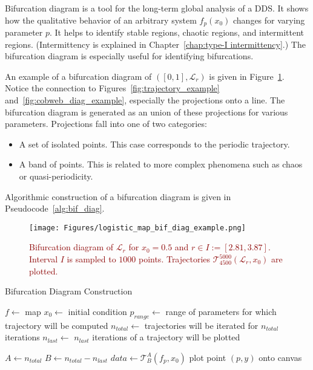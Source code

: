 \begin{remark}
\label{def: bif_diag} 
    Bifurcation diagram is a tool for the long-term global analysis of a DDS.
    It shows how the qualitative behavior of an arbitrary system $f_{p}(x_0)$ changes for varying parameter $p$.
    It helps to identify stable regions, chaotic regions, and intermittent regions. (Intermittency is explained in Chapter~\ref{chap:type-I intermittency}.)
    The bifurcation diagram is especially useful for identifying bifurcations.
    \par
    An example of a bifurcation diagram of $\left( [0,1], \mathcal{L}_{r} \right)$ is given in Figure~\ref{fig:bif_diag_example}.
    Notice the connection to Figures~\ref{fig:trajectory_example} and~\ref{fig:cobweb_diag_example}, especially the projections onto a line.
    The bifurcation diagram is generated as an union of these projections for various parameters.
    Projections fall into one of two categories:
    \begin{itemize}
        \item{A set of isolated points. This case corresponds to the periodic trajectory.}
        \item{A band of points. This is related to more complex phenomena such as chaos or quasi-periodicity.}
    \end{itemize}
    \par
    Algorithmic construction of a bifurcation diagram is given in Pseudocode~\ref{alg:bif_diag}.
\end{remark}

\begin{figure}[!h]
    \centering
    \texttt{[image: Figures/logistic\_map\_bif\_diag\_example.png]}
    \caption{
        \textcolor{darkred}{
        Bifurcation diagram of $\mathcal{L}_{r}$ for $x_0 = 0.5$ and $r \in I := [ 2.81, 3.87 ]$. 
        Interval $I$ is sampled to $1000$ points. 
        Trajectories $\mathcal{T}_{4500}^{5000}(\mathcal{L}_{r}, x_0)$ are plotted.
        }
    }
    \label{fig:bif_diag_example}
\end{figure}

\begin{algorithm}
\caption{Bifurcation Diagram Construction}\label{alg:bif_diag}
\begin{algorithmic}[1]
\Statex $f \gets$ map
\Statex $x_0 \gets$ initial condition
\Statex $p_{range} \gets$ range of parameters for which trajectory will be computed
\Statex $n_{total} \gets$ trajectories will be iterated for $n_{total}$ iterations
\Statex $n_{last} \gets$ $n_{last}$ iterations of a trajectory will be plotted

    \State $A \gets n_{total}$
    \State $B \gets n_{total} - n_{last}$
    \State $data \gets \mathcal{T}_{B}^{A}(f_p, x_0)$
        \State plot point $(p, y)$ onto canvas
    \EndFor
\EndFor

\end{algorithmic}
\end{algorithm}


